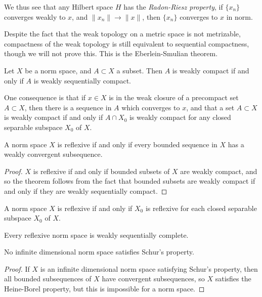 We thus see that any Hilbert space $H$ has the \emph{Radon-Riesz property}, if $\{ x_n \}$ converges weakly to $x$, and $\| x_n \| \to \| x \|$, then $\{ x_n \}$ converges to $x$ in norm.

Despite the fact that the weak topology on a metric space is not metrizable, compactness of the weak topology is still equivalent to sequential compactness, though we will not prove this. This is the Eberlein-Smulian theorem.

\begin{theorem}
    Let $X$ be a norm space, and $A \subset X$ a subset. Then $A$ is weakly compact if and only if $A$ is weakly sequentially compact.
\end{theorem}

One consequence is that if $x \in X$ is in the weak closure of a precompact set $A \subset X$, then there is a sequence in $A$ which converges to $x$, and that a set $A \subset X$ is weakly compact if and only if $A \cap X_0$ is weakly compact for any closed separable subspace $X_0$ of $X$.

\begin{corollary}
    A norm space $X$ is reflexive if and only if every bounded sequence in $X$ has a weakly convergent subsequence.
\end{corollary}
\begin{proof}
    $X$ is reflexive if and only if bounded subsets of $X$ are weakly compact, and so the theorem follows from the fact that bounded subsets are weakly compact if and only if they are weakly sequentially compact.
\end{proof}

\begin{corollary}
    A norm space $X$ is reflexive if and only if $X_0$ is reflexive for each closed separable subspace $X_0$ of $X$.
\end{corollary}

\begin{corollary}
    Every reflexive norm space is weakly sequentially complete.
\end{corollary}

\begin{corollary}
    No infinite dimensional norm space satisfies Schur's property.
\end{corollary}
\begin{proof}
    If $X$ is an infinite dimensional norm space satisfying Schur's property, then all bounded subsequences of $X$ have convergent subsequences, so $X$ satisfies the Heine-Borel property, but this is impossible for a norm space.
\end{proof}


